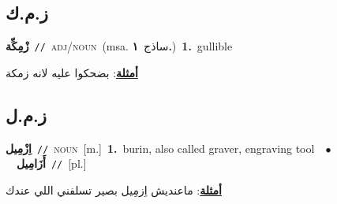 \documentclass[10pt,a4paper,twoside]{article} %
\begin{document}
\begin{multicols}{2}
\vspace{-3mm}
\subsection*{\color{blue}\foreignlanguage{arabic}{ز.م.ك}\color{blue}{}} 

{\setlength\topsep{0pt}\textbf{\foreignlanguage{arabic}{زْمِكِّة}}\ {\color{gray}\texttt{//}\color{black}}\ \textsc{adj/noun}\ \color{gray}(msa. \foreignlanguage{arabic}{ساذج}~\foreignlanguage{arabic}{\textbf{١.}})\color{black}\ \textbf{1.}~gullible\  \begin{flushright}\color{gray}\foreignlanguage{arabic}{\textbf{\underline{\foreignlanguage{arabic}{أمثلة}}}: بضحكوا عليه لانه زمكة}\end{flushright}\color{black}} \vspace{2mm}

\vspace{-3mm}
\subsection*{\color{blue}\foreignlanguage{arabic}{ز.م.ل}\color{blue}{}} 

{\setlength\topsep{0pt}\textbf{\foreignlanguage{arabic}{اِزْمِيل}}\ {\color{gray}\texttt{//}\color{black}}\ \textsc{noun}\ [m.]\ \textbf{1.}~burin, also called graver, engraving tool\ \ $\bullet$\ \ \setlength\topsep{0pt}\textbf{\foreignlanguage{arabic}{أَزَامِيل}}\ {\color{gray}\texttt{//}\color{black}}\ [pl.]\  \begin{flushright}\color{gray}\foreignlanguage{arabic}{\textbf{\underline{\foreignlanguage{arabic}{أمثلة}}}: ماعنديش اِزمِيل بصير تسلفني اللي عندك}\end{flushright}\color{black}} \vspace{2mm}


\end{multicols}
\end{document}
